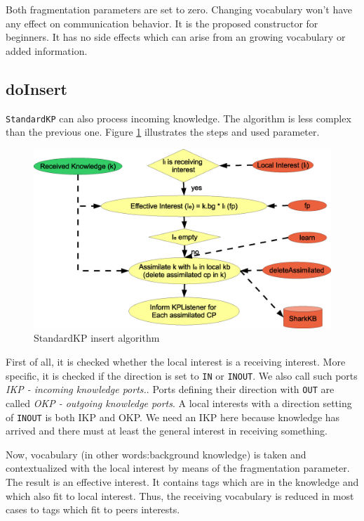 {Both fragmentation parameters are set to zero. Changing vocabulary won't have any effect on communication behavior. It is the proposed constructor for beginners. It has no side effects which can arise from an growing vocabulary or added information.

\subsection{doInsert}
{\tt StandardKP} can also process incoming knowledge. The algorithm is less complex than the previous one. Figure \ref{fig:StandardKP_insert} illustrates the steps and used parameter.

\begin{figure}[t]
\centering
\includegraphics[width=1.00\textwidth]{StandardKP_Insert.eps}
\caption{StandardKP insert algorithm}
\label{fig:StandardKP_insert}
\end{figure}

First of all, it is checked whether the local interest is a receiving interest. More specific, it is checked if the direction is set to {\tt IN} or {\tt INOUT}. We also call such ports {\it IKP - incoming knowledge ports.}. Ports defining their direction with {\tt OUT} are called {\it OKP - outgoing knowledge ports}. A local interests with a direction setting of {\tt INOUT} is both IKP and OKP.
We need an IKP here because knowledge has arrived and there must at least the general interest in receiving something. 

Now, vocabulary (in other words:background knowledge) is taken and contextualized with the local interest by means of the fragmentation parameter. 
The result is an {effective interest}. It contains tags which are in the knowledge and which also fit to local interest. Thus, the receiving vocabulary is reduced in most cases to tags which fit to peers interests.

}
